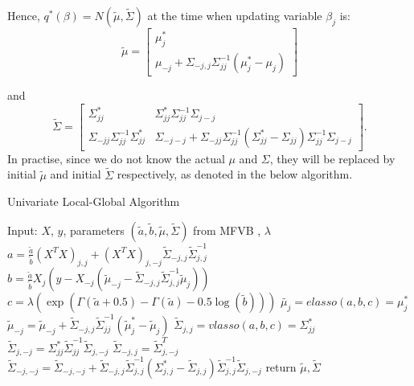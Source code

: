 \noindent Hence, $q^*(\beta) = N(\widetilde{\mu},\widetilde{\Sigma})$ at the time when updating variable $\beta_j$ is:
\begin{equation}
	\label{eq:LG_mu}
	\widetilde{\mu} =
	\left[ \begin{array}{c}
		\mu_j^* \\
		\mu_{-j} + \Sigma_{-j,j}\Sigma_{jj}^{-1}\left(\mu_j^* - \mu_j\right)
	\end{array} \right]
\end{equation}

\noindent and
\begin{equation}
	\label{eq:LG_sigma}
	\widetilde{\Sigma} = 
	\left[ \begin{array}{cc}
		\Sigma_{jj}^* & \Sigma_{jj}^* \Sigma_{jj}^{-1}\Sigma_{j-j} \\
		\Sigma_{-jj}  \Sigma_{jj}^{-1}\Sigma_{jj}^* & \Sigma_{-j-j} 
		+ \Sigma_{-jj}\Sigma_{jj}^{-1}  ( \Sigma_{jj}^* -\Sigma_{jj})  \Sigma_{jj}^{-1} \Sigma_{j-j}
	\end{array} \right].
\end{equation}
In practise, since we do not know the actual $\mu$ and $\Sigma$, they will be replaced by initial $\widetilde{\mu}$ and initial $\widetilde{\Sigma}$ respectively, as denoted in the below algorithm.
\newpage
\begin{algorithm}
	\caption{Univariate Local-Global Algorithm}
	\begin{algorithmic}[1]
		
    \State Input: $X$, $y$, parameters $(\tilde{a},\tilde{b},\tilde{\mu},\tilde{\Sigma})$ from MFVB , $\lambda$
	\State $a = \frac{\tilde{a}}{\tilde{b}}(X^TX)_{j,j} + (X^TX)_{j,-j}\tilde{\Sigma}_{-j,j}\tilde{\Sigma}_{j,j}^{-1}$ 
	\State $b = \frac{\tilde{a}}{\tilde{b}}  X_{j}(y-X_{-j}(\tilde{\mu}_{-j} - \tilde{\Sigma}_{-j,j}\tilde{\Sigma}_{j,j}^{-1}\tilde{\mu}_j))       $ 
	\State $c = \lambda (\exp(\Gamma(\tilde{a}+0.5) - \Gamma(\tilde{a}) - 0.5\log(\tilde{b})))  $ 
	\State $\tilde{\mu_{j}} =  elasso(a,b,c) = \mu_j ^*$ 
	\State $\tilde{\mu}_{-j} = \tilde{\mu}_{-j} +  \tilde{\Sigma}_{-j,j}\tilde{\Sigma}^{-1}_{jj}(\tilde{\mu}_j^*-\tilde{\mu}_j)$ 
	\State $\tilde{\Sigma}_{j,j} = vlasso(a,b,c) = \Sigma_{jj}^*$ 
	\State $\tilde{\Sigma}_{j,-j} = \Sigma_{jj}^*  \tilde{\Sigma}_{jj}^{-1}\tilde{\Sigma}_{j,-j} $ 
	\State $\tilde{\Sigma}_{-j,j} = \tilde{\Sigma}_{j,-j}^T$ 
	\State $\tilde{\Sigma}_{-j,-j} = \tilde{\Sigma}_{-j,-j} + \tilde{\Sigma}_{-j,j}\tilde{\Sigma}_{j,j}^{-1}(\Sigma_{j,j}^{*} - \tilde{\Sigma}_{j,j})\tilde{\Sigma}_{j,j}^{-1}\tilde{\Sigma}_{j,-j}$ 		
	\EndFor
	\EndWhile
	\State return $\tilde{\mu},\tilde{\Sigma}$
	\end{algorithmic}
\end{algorithm}
